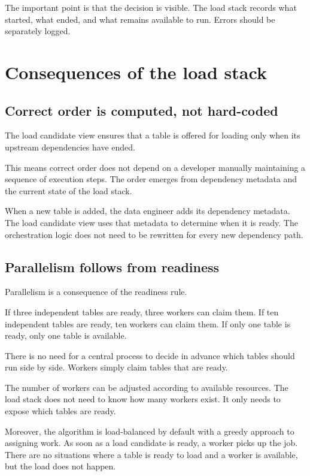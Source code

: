 \documentclass[10pt,openany,10pt]{book}
\begin{document}
The important point is that the decision is visible. The load stack
records what started, what ended, and what remains available to run.
Errors should be separately logged.

\section{Consequences of the load
stack}\label{consequences-of-the-load-stack}

\subsection{Correct order is computed, not
hard-coded}\label{correct-order-is-computed-not-hard-coded}

The load candidate view ensures that a table is offered for loading only
when its upstream dependencies have ended.

This means correct order does not depend on a developer manually
maintaining a sequence of execution steps. The order emerges from
dependency metadata and the current state of the load stack.

When a new table is added, the data engineer adds its dependency
metadata. The load candidate view uses that metadata to determine when
it is ready. The orchestration logic does not need to be rewritten for
every new dependency path.

\subsection{Parallelism follows from
readiness}\label{parallelism-follows-from-readiness}

Parallelism is a consequence of the readiness rule.

If three independent tables are ready, three workers can claim them. If
ten independent tables are ready, ten workers can claim them. If only
one table is ready, only one table is available.

There is no need for a central process to decide in advance which tables
should run side by side. Workers simply claim tables that are ready.

The number of workers can be adjusted according to available resources.
The load stack does not need to know how many workers exist. It only
needs to expose which tables are ready.

Moreover, the algorithm is load-balanced by default with a greedy
approach to assigning work. As soon as a load candidate is ready, a
worker picks up the job. There are no situations where a table is ready
to load and a worker is available, but the load does not happen.
\end{document}
